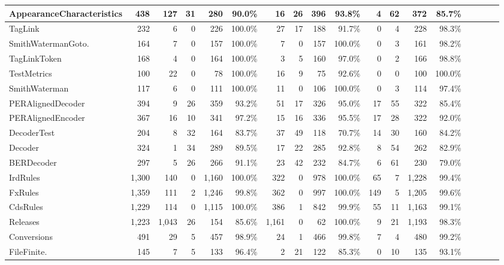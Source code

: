 \begin{table*}[t]
\begin{SmallOut}
\begin {tabular} {|l|r|r|r|r|r|r|r|r|r|r|r|r|r|r|r|r|r|}
\hline
  AppearanceCharacteristics    & 438  & 127 & 31 & 280 & 90.0\% & 16 & 26 & 396 & 93.8\% & 4  & 62& 372  & 85.7\%\\
\hline\hline
  TagLink                      & 232  & 6   & 0  & 226 & 100.0\%& 27 & 17 & 188 & 91.7\% & 0  & 4 & 228  & 98.3\%\\
\hline
SmithWatermanGoto.             & 164 & 7   &  0 & 157 & 100.0\%& 7 & 0  & 157 & 100.0\%& 0  & 3 & 161  & 98.2\%\\
\hline
  TagLinkToken                  & 168 & 4   & 0  & 164 & 100.0\%& 3  & 5  & 160 & 97.0\% & 0  & 2 & 166  & 98.8\%\\
\hline
  TestMetrics                   & 100 & 22  & 0  & 78  & 100.0\%& 16 & 9  & 75  & 92.6\% & 0  & 0 & 100  & 100.0\%\\
\hline
  SmithWaterman                 & 117 & 6   & 0  & 111 & 100.0\%& 11 & 0  & 106 & 100.0\%& 0  & 3 & 114  & 97.4\%\\
\hline\hline
  PERAlignedDecoder & 394  & 9  & 26 & 359 & 93.2\% & 51 & 17 & 326 & 95.0\% & 17 & 55 & 322 & 85.4\%\\
\hline
  PERAlignedEncoder & 367  & 16 & 10 & 341 & 97.2\% & 15 & 16 & 336 & 95.5\% & 17 & 28 & 322 & 92.0\%\\
\hline
  DecoderTest       & 204  & 8  & 32 & 164 & 83.7\% & 37 & 49  & 118& 70.7\% & 14 & 30 & 160 & 84.2\%\\
\hline
  Decoder           & 324  & 1  & 34 & 289 & 89.5\% & 17 & 22  & 285& 92.8\% & 8  & 54 & 262 & 82.9\%\\
\hline
  BERDecoder        & 297  & 5  & 26 & 266 & 91.1\% & 23 & 42  & 232& 84.7\% & 6  & 61 & 230 & 79.0\%\\
\hline\hline
  IrdRules          & 1,300 & 140& 0  & 1,160& 100.0\%& 322 & 0  & 978 & 100.0\%& 65 &7  & 1,228 & 99.4\%\\
\hline
  FxRules           & 1,359 & 111& 2  & 1,246& 99.8\% & 362 & 0  & 997 & 100.0\%& 149& 5 & 1,205 & 99.6\%\\
\hline
  CdsRules          & 1,229 & 114& 0  & 1,115& 100.0\%& 386 & 1  & 842 & 99.9\% & 55 & 11 & 1,163& 99.1\%\\
\hline
  Releases          & 1,223 &1,043& 26 & 154 & 85.6\% & 1,161& 0  & 62  & 100.0\%& 9  & 21 & 1,193& 98.3\%\\
\hline
  Conversions       & 491  & 29 & 5  & 457 & 98.9\% & 24  & 1  & 466 & 99.8\% & 7  & 4  & 480 & 99.2\%\\
\hline\hline
FileFinite.    & 145  & 7  & 5  & 133 & 96.4\% & 2   & 21 & 122 & 85.3\% & 0  & 10& 135  & 93.1\%\\

\end{tabular}
\end{SmallOut}
\end{table*}
